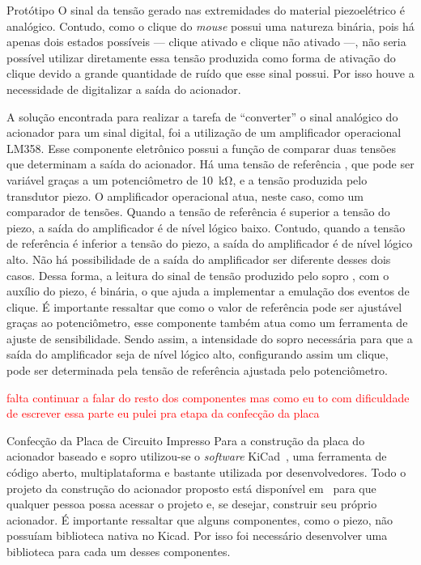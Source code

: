 \begin{chapter}{Protótipo}
O sinal da tensão gerado nas extremidades do material piezoelétrico é analógico.
Contudo, como o clique do \textit{mouse} possui uma natureza binária, pois há
apenas dois estados possíveis --- clique ativado e clique não ativado ---, não
seria possível utilizar diretamente essa tensão produzida como forma de ativação
do clique devido a grande quantidade de ruído que esse sinal possui. Por isso 
houve a necessidade de digitalizar a saída do acionador.

A solução encontrada para realizar a tarefa de ``converter'' o sinal analógico
do acionador para um sinal digital, foi a utilização de um amplificador
operacional LM358. Esse componente eletrônico possui a função de comparar duas
tensões que determinam a saída do acionador. Há uma tensão de referência
, que pode ser variável graças a um potenciômetro de 10~k\si{\ohm}, e a tensão
produzida pelo transdutor piezo. O amplificador operacional atua, neste caso,
como um comparador de tensões. Quando a tensão de referência é superior a tensão
do piezo, a saída do amplificador é de nível lógico baixo. Contudo, quando a
tensão de referência é inferior a tensão do piezo, a saída do amplificador é de
nível lógico alto. Não há possibilidade de a saída do amplificador ser diferente
desses dois casos. Dessa forma, a leitura do sinal de tensão produzido pelo sopro
, com o auxílio do piezo, é binária, o que ajuda a implementar a emulação dos
eventos de clique. É importante ressaltar que como o valor de referência 
pode ser ajustável graças ao potenciômetro, esse componente também atua como um
ferramenta de ajuste de sensibilidade. Sendo assim, a intensidade do sopro
necessária para que a saída do amplificador seja de nível lógico alto,
configurando assim um clique, pode ser determinada pela tensão de referência
ajustada pelo potenciômetro.

\textcolor{red}{falta continuar a falar do resto dos componentes mas como eu to
com dificuldade de escrever essa parte eu pulei pra etapa da confecção da placa}

\begin{section}{Confecção da Placa de Circuito Impresso}
Para a construção da placa do acionador baseado e sopro utilizou-se o
\textit{software} KiCad~\cite{kicad}, uma ferramenta de código aberto,
multiplataforma e bastante utilizada por desenvolvedores. Todo o projeto da
construção do acionador proposto está disponível em~\cite{ErickGit} para que
qualquer pessoa possa acessar o projeto e, se desejar, construir seu próprio
acionador. É importante ressaltar que alguns componentes, como o piezo, não
possuíam biblioteca nativa no Kicad. Por isso foi necessário desenvolver uma 
biblioteca para cada um desses componentes.


\end{section}
\end{chapter}
